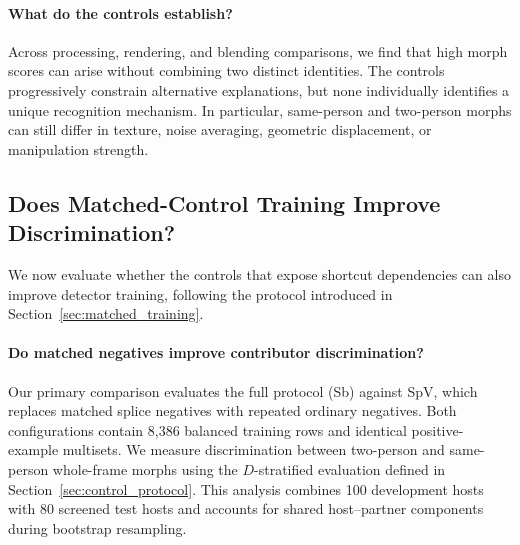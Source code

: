\paragraph{What do the controls establish?}
Across processing, rendering, and blending comparisons,
we find that high morph scores can arise without
combining two distinct identities. The controls progressively constrain alternative
explanations, but none individually identifies a
unique recognition mechanism. In particular,
same-person and two-person morphs can still differ
in texture, noise averaging, geometric displacement,
or manipulation strength.

%
%


\subsection{Does Matched-Control Training Improve Discrimination?}
\label{sec:training_results}

We now evaluate whether the controls that expose
shortcut dependencies can also improve detector
training, following the protocol introduced in
Section~\ref{sec:matched_training}.


\paragraph{Do matched negatives improve contributor
discrimination?}
Our primary comparison evaluates the full protocol
(Sb) against SpV, which replaces matched splice
negatives with repeated ordinary negatives.
Both configurations contain 8,386 balanced
training rows and identical positive-example
multisets.
We measure discrimination between two-person and
same-person whole-frame morphs using the
$D$-stratified evaluation defined in
Section~\ref{sec:control_protocol}.
This analysis combines 100 development hosts with
80 screened test hosts and accounts for shared
host--partner components during bootstrap
resampling. 

